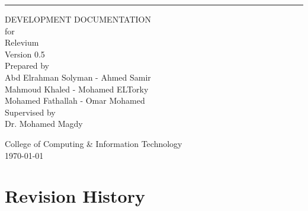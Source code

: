 \documentclass{scrreprt}
\date{\today}
\def\myversion{0.5}
\begin{document}
\begin{flushright}
    \rule{16cm}{5pt}\vskip1cm
    \begin{bfseries}
        \Huge{DEVELOPMENT DOCUMENTATION}\\
        \vspace{1cm}
        for\\
        \vspace{1cm}
        Relevium\\
        \vspace{1cm}
        \LARGE{Version \myversion}\\
        \vspace{1cm}
        Prepared by\\
        Abd Elrahman Solyman - 
        Ahmed Samir \\
        Mahmoud Khaled -
        Mohamed ELTorky \\ 
        Mohamed Fathallah -
        Omar Mohamed\\
        
        \vspace{1cm}
        Supervised by\\
        Dr. Mohamed Magdy

        \vspace{1.2cm}
        College of Computing \& Information Technology\\
        \vspace{1.2cm}
        \today\\
    \end{bfseries}
\end{flushright}

\tableofcontents
\begingroup
\let\clearpage\relax
\listoffigures
\endgroup


\newpage


\chapter*{Revision History}
\end{document}
